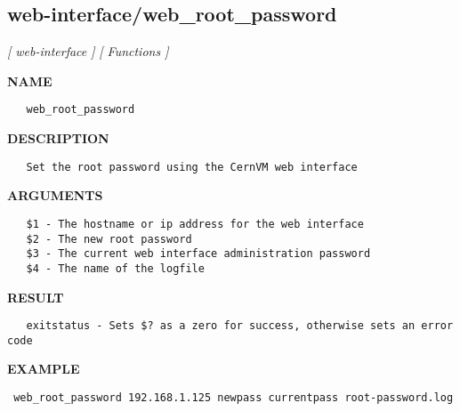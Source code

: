 \subsection{web-interface/web\_root\_password}
\textsl{[ web-interface ]}
\textsl{[ Functions ]}

\label{ch:robo82}
\label{ch:web_interface_web_root_password}
\textbf{NAME}
\begin{verbatim}
   web_root_password
\end{verbatim}
\textbf{DESCRIPTION}
\begin{verbatim}
   Set the root password using the CernVM web interface
\end{verbatim}
\textbf{ARGUMENTS}
\begin{verbatim}
   $1 - The hostname or ip address for the web interface
   $2 - The new root password
   $3 - The current web interface administration password
   $4 - The name of the logfile
\end{verbatim}
\textbf{RESULT}
\begin{verbatim}
   exitstatus - Sets $? as a zero for success, otherwise sets an error code
\end{verbatim}
\textbf{EXAMPLE}
\begin{verbatim}
 web_root_password 192.168.1.125 newpass currentpass root-password.log
\end{verbatim}


